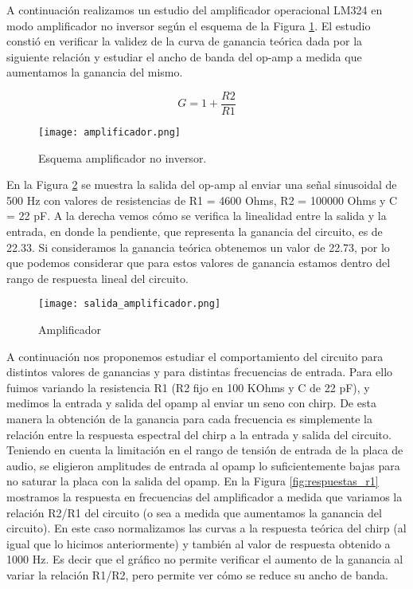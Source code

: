 \documentclass[a4paper, 11pt]{article}
\begin{document}
A continuación realizamos un estudio del amplificador operacional LM324 en modo amplificador no inversor según el esquema de la Figura \ref{fig:amplificador}. El estudio constió en verificar la validez de la curva de ganancia teórica dada por la siguiente relación y estudiar el ancho de banda del op-amp a medida que aumentamos la ganancia del mismo.

\[
 G = 1 + \frac{R2}{R1}
\]


\begin{figure} [H]
\centering
\texttt{[image: amplificador.png]}
\caption{ Esquema amplificador no inversor. \label{fig:amplificador}}
\end{figure} 


En la Figura \ref{fig:salida_amplificador} se muestra la salida del op-amp al enviar una señal sinusoidal de 500 Hz con valores de resistencias de R1 = 4600 Ohms, R2 = 100000 Ohms y C = 22 pF. A la derecha vemos cómo se verifica la linealidad entre la salida y la entrada, en donde la pendiente, que representa la ganancia del circuito, es de 22.33. Si consideramos la ganancia teórica obtenemos un valor de 22.73, por lo que podemos considerar que para estos valores de ganancia estamos dentro del rango de respuesta lineal del circuito.

\begin{figure} [H]
\centering
\texttt{[image: salida\_amplificador.png]}
\caption{ Amplificador\label{fig:salida_amplificador}}
\end{figure} 

A continuación nos proponemos estudiar el comportamiento del circuito para distintos valores de ganancias y para distintas frecuencias de entrada. Para ello fuimos variando la resistencia R1 (R2 fijo en 100 KOhms y C de 22 pF), y medimos la entrada y salida del opamp al enviar un seno con chirp. De esta manera la obtención de la ganancia para cada frecuencia es simplemente la relación entre la respuesta espectral del chirp a la entrada y salida del circuito. Teniendo en cuenta la limitación en el rango de tensión de entrada de la placa de audio, se eligieron amplitudes de entrada al opamp lo suficientemente bajas para no saturar la placa con la salida del opamp. En la Figura \ref{fig:respuestas_r1} mostramos la respuesta en frecuencias del amplificador a medida que variamos la relación R2/R1 del circuito (o sea a medida que aumentamos la ganancia del circuito). En este caso normalizamos las curvas a la respuesta teórica del chirp (al igual que lo hicimos anteriormente) y también al valor de respuesta obtenido a 1000 Hz. Es decir que el gráfico no permite verificar el aumento de la ganancia al variar la relación R1/R2, pero permite ver cómo se reduce su ancho de banda. 
\end{document}

